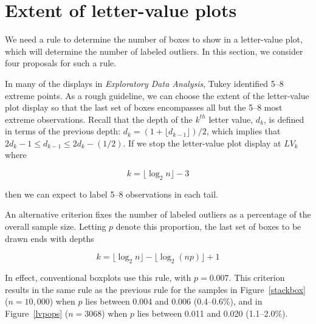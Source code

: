 \documentclass[12pt,oneside]{article}
\begin{document}
\section{Extent of letter-value plots}
\label{sec:extent}

We need a rule to determine the number of boxes to show in a letter-value plot, which will determine the number of labeled outliers. In this section, we consider four proposals for such a rule.

In many of the displays in \textit{Exploratory Data Analysis}, Tukey identified 5--8 extreme points. As a rough guideline, we can choose the extent of the letter-value plot display so that the last set of boxes encompasses all but the 5--8 most extreme observations. Recall that the depth of the $k^{th}$ letter value, $d_k$, is defined in terms of the previous depth: $d_k = (1 + \lfloor d_{k-1} \rfloor)/2$, which implies that $2 d_{k} -1 \leq d_{k-1} \leq 2 d_k - (1/2)$. If we stop the letter-value plot display at $LV_k$ where 

\begin{equation}
k = \lfloor \log_2 n \rfloor - 3
\end{equation}

\noindent then we can expect to label 5--8 observations in each tail.  %

An alternative criterion fixes the number of labeled outliers as a percentage of the overall sample size. Letting $p$ denote this proportion, the last set of boxes to be drawn ends with depths

\begin{equation}
k = \lfloor \log_2 n \rfloor - \lfloor \log_2 (np) \rfloor + 1
\end{equation}

\noindent In effect, conventional boxplots use this rule, with $p = 0.007$. This criterion results in the same rule as the previous rule for the samples in Figure~\ref{stackbox} ($n = 10,000$) when $p$ lies between 0.004 and 0.006 (0.4--0.6\%), and in Figure~\ref{lvpops} ($n = 3068$) when $p$ lies between 0.011 and 0.020 (1.1--2.0\%).
\end{document}
